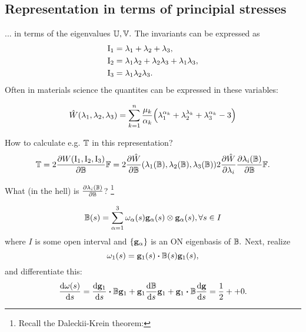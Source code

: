 \documentclass[reqno, a4paper]{article}
\begin{document}
\subsection{Representation in terms of principial stresses}
\label{sec:representation_principial}
... in terms of the eigenvalues $\mathbb{U},\mathbb{V}.$ The invariants can be expressed as
\begin{align*}
	\operatorname{I_1} &= \lambda_1+\lambda_2 + \lambda_3, \\
	\operatorname{I_2} &= \lambda_1 \lambda_2 + \lambda_2 \lambda_3 + \lambda_1 \lambda_3,\\
	\operatorname{I_3} &= \lambda_1 \lambda_2 \lambda_3.
\end{align*}
Often in materials science the quantites can be expressed in these variables:

\begin{example}
	\[
		\hat{W}\qty(\lambda_1,\lambda_2,\lambda_3) = \sum_{k=1}^n \frac{\mu_k}{\alpha_k}\qty(\lambda_1^{\alpha_k}+\lambda_2^{\lambda_k}+\lambda_3^{\alpha_k}-3)
	\]
\end{example}
How to calculate e.g. $\mathbb{T}$ in this representation?
\[
	\mathbb{T} = 2 \pdv{W\qty(\operatorname{I_1}, \operatorname{I_2}, \operatorname{I_3})}{\ensuremath{\mathbb{B}}}\mathbb{F} = 2 \pdv{\hat{W}}{\ensuremath{\mathbb{B}}}\qty(\lambda_1\qty(\mathbb{B}), \lambda_2\qty(\mathbb{B}), \lambda_3\qty(\mathbb{B})) 2 \pdv{\hat{W}}{\lambda_i}\pdv{\lambda_i\qty(\ensuremath{\mathbb{B}})}{\ensuremath{\mathbb{B}}}\mathbb{F}.
\]

What (in the hell) is $\pdv{\lambda_i\qty(\ensuremath{\mathbb{B}})}{\ensuremath{\mathbb{B}}}$? \footnote{Recall the Daleckii-Krein theorem:}

\[
	\mathbb{B}(s) = \sum_{\alpha = 1}^3 \omega_{\alpha}(s) \vb{g}_{\alpha}(s) \otimes \vb{g}_{\alpha}(s), \forall s \in I
\]
where $I$ is some open interval and $\{\vb{g}_{\alpha}\}$ is an ON eigenbasis of $\mathbb{B}.$ Next, realize
\[
	\omega_1(s) = \vb{g}_1(s)\vdot \lcg(s) \vb{g}_1(s),
\]
and differentiate this:
\[
	\dv{\omega(s)}{s} = \dv{\vb{g}_1}{s}\vdot \lcg \vb{g}_1  + \vb{g}_1 \dv{\lcg}{s}\vb{g}_1+\vb{g}_1 \vdot \lcg \dv{\vb{g}}{s} = \frac{1}{2} + +0.
\]

\end{document}
